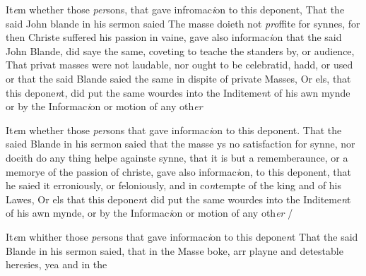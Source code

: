 \documentclass[12pt, a4paper]{book}
\begin{document}
 



				\marginpar[\vspace{0.5cm}{\textcolor{Gray}{2.}}]{}
			
	
		\ifthenelse{\isodd{\thepage}}
		{\reversemarginpar}
		{\normalmarginpar}
		 It\textit{e}m whether those \textit{per}sons, that gave infromac\textit{i}on to this
		deponent, That the said John blande in his sermon saied
 The masse doieth not \textit{pro}ffite for synnes, for then Christe
 suffered his passion in vaine, gave also informac\textit{i}on
		that the said John Blande, did saye the same, coveting to
 teache the standers by, or audience, That privat masses
 were not laudable, nor ought to be celebratid, hadd, or used
 or that the said Blande saied the same in dispite of
 private Masses, Or els, that this depone\textit{n}t, did put
 the same wourdes into the Inditeme\textit{n}t of his awn mynde
 or by the Informac\textit{i}on or motion of any oth\textit{er}
 




				\marginpar[\vspace{0.5cm}{\textcolor{Gray}{3.}}]{}
			
	
		\ifthenelse{\isodd{\thepage}}
		{\reversemarginpar}
		{\normalmarginpar}
		 It\textit{e}m whether those \textit{per}sons that gave informac\textit{i}on to this
		deponent. That the saied Blande in his sermon saied
 that the masse ys no satisfaction for synne, nor doeith
 do any thing helpe againste synne, that it is but
 a rememberaunce, or a memorye of the passion of christe,
 gave also informac\textit{i}on, to this deponent, that he saied it
 erroniously, or feloniously, and in co\textit{n}tempte of the king and
 of his Lawes, Or els that this depone\textit{n}t did put the same
 wourdes into the Inditeme\textit{n}t of his awn mynde, or by the
 Informac\textit{i}on or motion of any oth\textit{er} /
 




				\marginpar[\vspace{0.5cm}{\textcolor{Gray}{4.}}]{}
			
	
		\ifthenelse{\isodd{\thepage}}
		{\reversemarginpar}
		{\normalmarginpar}
		 It\textit{e}m whither those \textit{per}sons that gave informac\textit{i}on to this depone\textit{n}t
		That the said Blande in his sermon saied, that  in the Masse
 boke, arr playne and detestable heresies, yea and in the

\dotfill
						\newpage
{}
\end{document}
